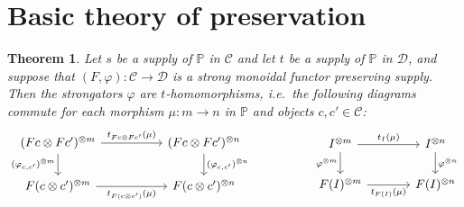 \documentclass[11pt, oneside, article]{memoir}
\theoremstyle{plain}
\newtheorem{theorem}{Theorem}[chapter]
\theoremstyle{definition}
\theoremstyle{remark}
\newcommand{\cat}[1]{\mathcal{#1}}%
\newcommand{\tpow}[1]{^{\otimes #1}}
\newcommand{\pp}{\mathbb{P}}
\begin{document}
\section{Basic theory of preservation}\label{sec.preserve_thms}


\begin{theorem}\label{thm.pres_supp_strongators_homo}
Let $s$ be a supply of $\pp$ in $\cat{C}$ and let $t$ be a supply of $\pp$ in $\cat{D}$, and suppose that $(F,\varphi)\colon\cat{C}\to\cat{D}$ is a strong monoidal functor preserving supply. Then the strongators $\varphi$ are $t$-homomorphisms, i.e.\ the following diagrams commute for each morphism $\mu\colon m\to n$ in $\pp$ and objects $c,c'\in\cat{C}$:
\[
\begin{tikzcd}[column sep=50pt]
	(Fc\otimes Fc')\tpow{m}
		\ar[r, "t_{Fc\otimes Fc'}(\mu)"]\ar[d, "(\varphi_{c,c'})\tpow{m}"']&
 	(Fc\otimes Fc')\tpow{n}\ar[d, "(\varphi_{c,c'})\tpow{n}"]\\
  F(c\otimes c')\tpow{m}\ar[r, "t_{F(c\otimes c')}(\mu)"']&
  F(c\otimes c')\tpow{n}
\end{tikzcd}
\hspace{.7in}
\begin{tikzcd}[column sep=35pt]
	I\tpow{m}
		\ar[r, "t_I(\mu)"]\ar[d, "\varphi\tpow{m}"']&
 	I\tpow{n}\ar[d, "\varphi\tpow{n}"]\\
  F(I)\tpow{m}\ar[r, "t_{F(I)}(\mu)"']&
  F(I)\tpow{n}
\end{tikzcd}
\]
\end{theorem}
\end{document}
